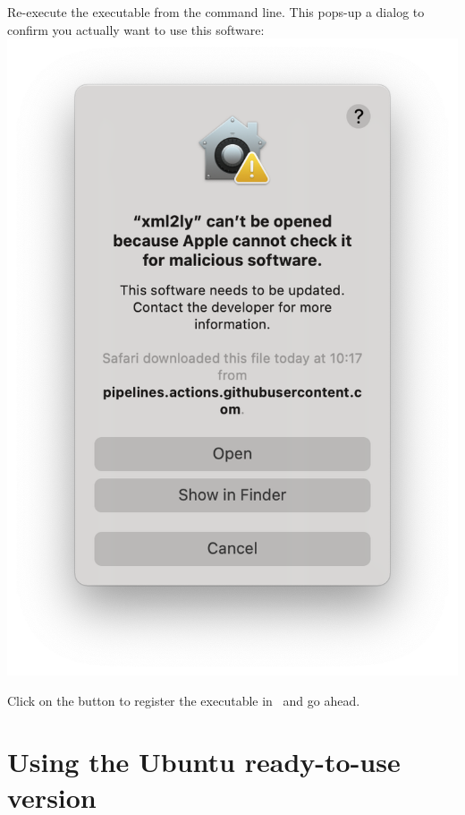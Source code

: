Re-execute the executable from the command line. This pops-up a dialog to confirm you actually want to use this software:\\
\includegraphics[scale=0.35]{../graphics/MacOSConfirmOpening.png}

Click on the  button to register the executable in \Gatekeeper\ and go ahead.


\section{Using the Ubuntu ready-to-use version}

